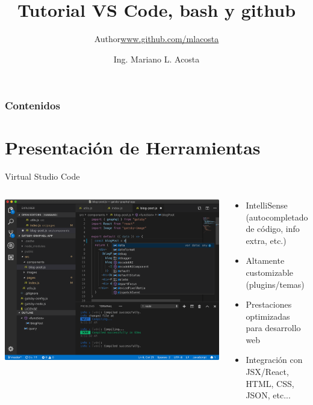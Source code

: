 \documentclass{beamer}
\title{Tutorial VS Code, bash y github}
\author{\texorpdfstring{Author\newline\url{www.github.com/mlacosta}}{Author}}
\author{Ing. Mariano L. Acosta}
\begin{document}
\begin{frame}[plain]
    \maketitle
\end{frame}


\begin{frame}
	\frametitle{Contenidos}
	\tableofcontents
\end{frame}

\section{Presentación de Herramientas}

\begin{frame}{Virtual Studio Code}
	\begin{columns}
  		\begin{column}{.5\textwidth}
			\includegraphics[scale=.15]{img/vscode.png}
		\end{column}
		\begin{column}{.5\textwidth}
				
			\begin{itemize}
				\item IntelliSense (autocompletado de código, info extra, etc.)
				\item Altamente customizable (plugins/temas)
				\item Prestaciones optimizadas para desarrollo web
				\item Integración con JSX/React, HTML, CSS, JSON, etc...
			\end{itemize}
		\end{column}
	\end{columns}
\end{frame}
\end{document}
